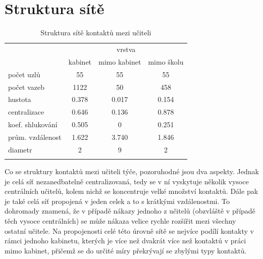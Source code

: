 \section*{Struktura sítě} 

\begin{table}[]
    \centering
    \caption{Struktura sítě kontaktů mezi učiteli}
\begin{tabular}{lccc}
\hline
                 & \multicolumn{3}{c}{vrstva}                                                                      \\ 
                 & \multicolumn{1}{l}{kabinet} & \multicolumn{1}{l}{mimo kabinet} & \multicolumn{1}{l}{mimo školu} \\ \hline
počet uzlů       & 55                          & 55                               & 55                             \\
počet vazeb      & 1122                        & 50                               & 458                            \\
hustota          & 0.378                       & 0.017                            & 0.154                          \\
centralizace     & 0.646                       & 0.136                            & 0.878                          \\
koef. shlukování & 0.505                       & 0                                & 0.251                          \\
prům. vzdálenost & 1.622                       & 3.740                            & 1.846                          \\
diametr          & 2                           & 9                                & 2                              \\ \hline
\label{fig:100-teachers}
\end{tabular}
\end{table}

Co se struktury kontaktů mezi učiteli týče, pozoruhodné jsou dva aspekty. Jednak je celá síť nezanedbatelně centralizovaná, tedy se v ní vyskytuje několik vysoce centrálních učitelů, kolem nichž se koncentruje velké množství kontaktů. Dále pak je také celá síť propojená v jeden celek a to s krátkými vzdálenostmi. To dohromady znamená, že v případě nákazy jednoho z učitelů (obzvláště v případě těch vysoce centrálních) se může nákaza velice rychle rozšířit mezi všechny ostatní učitele. Na propojenosti celé této úrovně sítě se nejvíce podílí kontakty v rámci jednoho kabinetu, kterých je více než dvakrát více než kontaktů v práci mimo kabinet, přičemž se do určité míry překrývají se zbylými typy kontaktů. 

